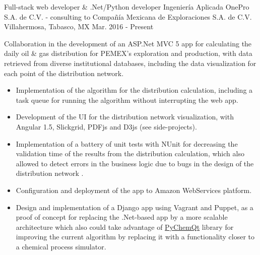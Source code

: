 


\begin{cventries}


\cventry
{Full-stack web developer \& .Net/Python developer} %
{Ingeniería Aplicada OnePro S.A. de C.V. - consulting to Compañía Mexicana de Exploraciones S.A. de C.V.} %
{Villahermosa, Tabasco, MX} %
{Mar. 2016 - Present} %
{ %
	\begin{cvitems}
		\item {Collaboration in the development of an ASP.Net MVC 5 app for calculating the daily oil \& gas distribution for PEMEX's exploration and production, with data retrieved from diverse institutional databases, including the data visualization for each point of the distribution network.}
		\begin{itemize}
			\item {Implementation of the algorithm for the distribution calculation, including a task queue for running the algorithm without interrupting the web app.}
			\item {Development of the UI for the distribution network visualization, with Angular 1.5, Slickgrid, PDFjs and D3js {\tiny (see side-projects)}.}
			\item {Implementation of a battery of unit tests with NUnit for decreasing the validation time of the results from the distribution calculation, which also allowed to detect errors in the business logic due to bugs in the design of the distribution network .}
			\item {Configuration and deployment of the app to Amazon WebServices platform.}
			\item {Design and implementation of a Django app using Vagrant and Puppet, as a proof of concept for replacing the .Net-based app by a more scalable architecture which also could take advantage of \href{https://github.com/jjgomera/pychemqt}{PyChemQt} library for improving the current algorithm by replacing it with a functionality closer to a chemical process simulator.}
		\end{itemize}
	\end{cvitems}
}


\end{cventries}
